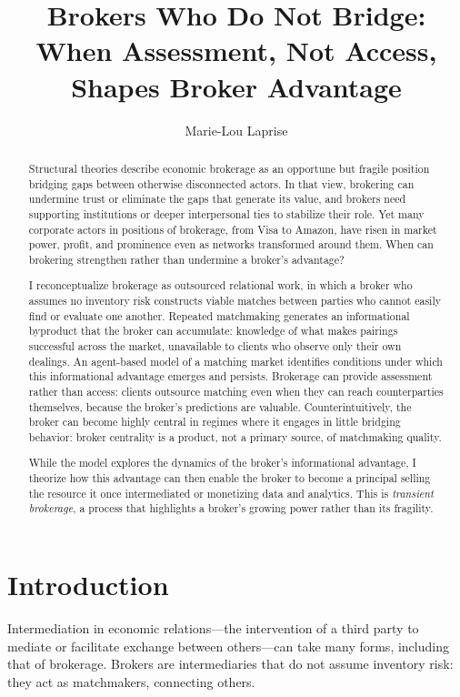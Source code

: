\documentclass[
]{article}
\title{Brokers Who Do Not Bridge: When Assessment, Not Access, Shapes Broker Advantage}
\author{Marie-Lou Laprise}
\date{}
\begin{document}
\maketitle
\thispagestyle{workingpaperfirst}
\begin{abstract}
Structural theories describe economic brokerage as an opportune but fragile position bridging gaps between otherwise disconnected actors. In that view, brokering can undermine trust or eliminate the gaps that generate its value, and brokers need supporting institutions or deeper interpersonal ties to stabilize their role. Yet many corporate actors in positions of brokerage, from Visa to Amazon, have risen in market power, profit, and prominence even as networks transformed around them. When can brokering strengthen rather than undermine a broker's advantage?

I reconceptualize brokerage as outsourced relational work, in which a broker who assumes no inventory risk constructs viable matches between parties who cannot easily find or evaluate one another. Repeated matchmaking generates an informational byproduct that the broker can accumulate: knowledge of what makes pairings successful across the market, unavailable to clients who observe only their own dealings. An agent-based model of a matching market identifies conditions under which this informational advantage emerges and persists. Brokerage can provide assessment rather than access: clients outsource matching even when they can reach counterparties themselves, because the broker's predictions are valuable. Counterintuitively, the broker can become highly central in regimes where it engages in little bridging behavior: broker centrality is a product, not a primary source, of matchmaking quality.

While the model explores the dynamics of the broker's informational advantage, I theorize how this advantage can then enable the broker to become a principal selling the resource it once intermediated or monetizing data and analytics. This is \emph{transient brokerage}, a process that highlights a broker's growing power rather than its fragility.
\end{abstract}

\section{Introduction}

Intermediation in economic relations---the intervention of a third party to mediate or facilitate exchange between others---can take many forms, including that of brokerage. Brokers are intermediaries that do not assume inventory risk: they act as matchmakers, connecting others.
\end{document}
